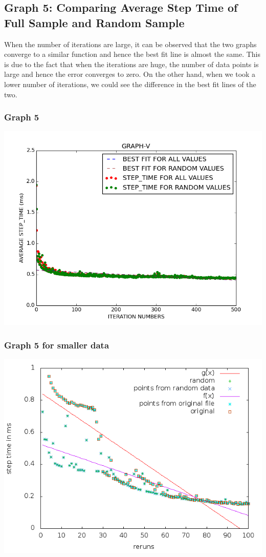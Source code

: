 \documentclass[11pt]{article}
\begin{document}
\subsection*{Graph 5: Comparing Average Step Time of Full Sample and Random Sample}
When the number of iterations are large, it can be observed that the two
graphs converge to a similar function and hence the best fit line is almost the same. This is due to the fact that
when the iterations are huge, the number of data points is large and hence the error converges to zero. On the
other hand, when we took a lower number of iterations, we could see the difference in the best fit lines of the two.
\subsubsection*{Graph 5}
\includegraphics[scale=0.3]{./images/plot5.png}
\subsubsection*{Graph 5 for smaller data}
\includegraphics[scale=0.25]{./images/g16_plot5.png}
\end{document}
